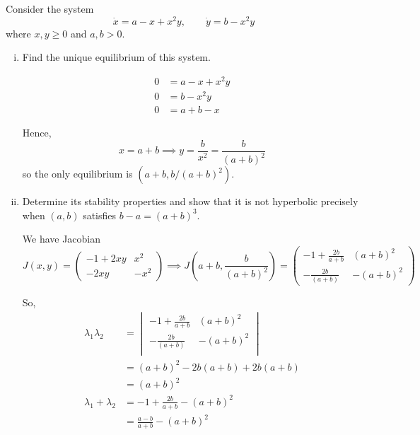 \documentclass[12pt]{article}
\begin{document}
Consider the system
\[
    \dot{x} = a-x+x^2y, \qquad
    \dot{y} = b-x^2y
\]
where $x,y\geq0$ and $a,b>0$.
\begin{enumerate}[(i)]
    \item Find the unique equilibrium of this system.

          \color{blue}
          \[\begin{array}{rl}
                  0 & = a - x + x^2y \\
                  0 & = b - x^2y     \\ \hline
                  0 & = a + b - x
              \end{array}\]

          Hence,
          \[x = a + b \implies y = \frac{b}{x^2} = \frac{b}{(a + b)^2}\]
          so the only equilibrium is $(a+b, b/(a+b)^2)$.
          \color{black}

    \item Determine its stability properties and show that it is not hyperbolic precisely when $(a,b)$ satisfies $b-a=(a+b)^3$.

          \color{blue}
          We have Jacobian
          \[J(x, y) = \begin{pmatrix}
                  -1 + 2xy & x^2  \\
                  -2xy     & -x^2
              \end{pmatrix} \implies J(a + b, \frac{b}{(a + b)^2}) = \begin{pmatrix}
                  -1 + \frac{2b}{a+ b} & (a + b)^2  \\
                  -\frac{2b}{(a + b)}  & -(a + b)^2
              \end{pmatrix}\]

          So,
          \begin{align*}
              \lambda_1 \lambda_2   & = \begin{vmatrix}
                                            -1 + \frac{2b}{a+ b} & (a + b)^2  \\
                                            -\frac{2b}{(a + b)}  & -(a + b)^2 \\
                                        \end{vmatrix} \\
                                    & = (a + b)^2 - 2b(a + b) + 2b(a + b) \\
                                    & = (a + b)^2                         \\
              \lambda_1 + \lambda_2 & = -1 + \frac{2b}{a + b} - (a + b)^2 \\
                                    & = \frac{a - b}{a + b} - (a + b)^2
          \end{align*}


\end{enumerate}
\end{document}
